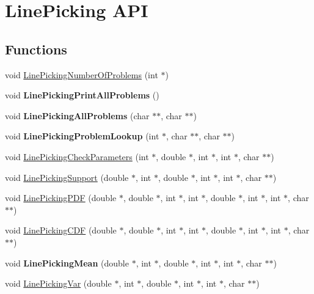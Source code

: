 \hypertarget{group__api}{\section{Line\-Picking A\-P\-I}
\label{group__api}
}
\subsection*{Functions}
\begin{DoxyCompactItemize}
\item 
void \hyperlink{group__api_gab0e3cb9eaef2a9f040f1135eee394f28}{Line\-Picking\-Number\-Of\-Problems} (int $\ast$)
\item 
\hypertarget{group__api_gaf35cfa0008791ab328033efdcb20a2bc}{void {\bfseries Line\-Picking\-Print\-All\-Problems} ()}\label{group__api_gaf35cfa0008791ab328033efdcb20a2bc}

\item 
\hypertarget{group__api_gaf04b41252ebd1a3013b6bcb4dbbf3649}{void {\bfseries Line\-Picking\-All\-Problems} (char $\ast$$\ast$, char $\ast$$\ast$)}\label{group__api_gaf04b41252ebd1a3013b6bcb4dbbf3649}

\item 
\hypertarget{group__api_ga146eea4bf38bd6e3812ea47ae2ac57a7}{void {\bfseries Line\-Picking\-Problem\-Lookup} (int $\ast$, char $\ast$$\ast$, char $\ast$$\ast$)}\label{group__api_ga146eea4bf38bd6e3812ea47ae2ac57a7}

\item 
void \hyperlink{group__api_gac55d1d166b33c8906ceccbb37010ddb0}{Line\-Picking\-Check\-Parameters} (int $\ast$, double $\ast$, int $\ast$, int $\ast$, char $\ast$$\ast$)
\item 
void \hyperlink{group__api_ga0aec0b2f87903f4bf4ad3011a99b3446}{Line\-Picking\-Support} (double $\ast$, int $\ast$, double $\ast$, int $\ast$, int $\ast$, char $\ast$$\ast$)
\item 
void \hyperlink{group__api_ga8feba9835984bd74f3d919f51389e573}{Line\-Picking\-P\-D\-F} (double $\ast$, double $\ast$, int $\ast$, int $\ast$, double $\ast$, int $\ast$, int $\ast$, char $\ast$$\ast$)
\item 
void \hyperlink{group__api_ga445ba2c007d60d789747cecbd5f874b9}{Line\-Picking\-C\-D\-F} (double $\ast$, double $\ast$, int $\ast$, int $\ast$, double $\ast$, int $\ast$, int $\ast$, char $\ast$$\ast$)
\item 
\hypertarget{group__api_ga39879835a11f7af8bf65699f9d83a5cb}{void {\bfseries Line\-Picking\-Mean} (double $\ast$, int $\ast$, double $\ast$, int $\ast$, int $\ast$, char $\ast$$\ast$)}\label{group__api_ga39879835a11f7af8bf65699f9d83a5cb}

\item 
void \hyperlink{group__api_ga08fecba488534373e8d1710f273bc49c}{Line\-Picking\-Var} (double $\ast$, int $\ast$, double $\ast$, int $\ast$, int $\ast$, char $\ast$$\ast$)
\end{DoxyCompactItemize}


